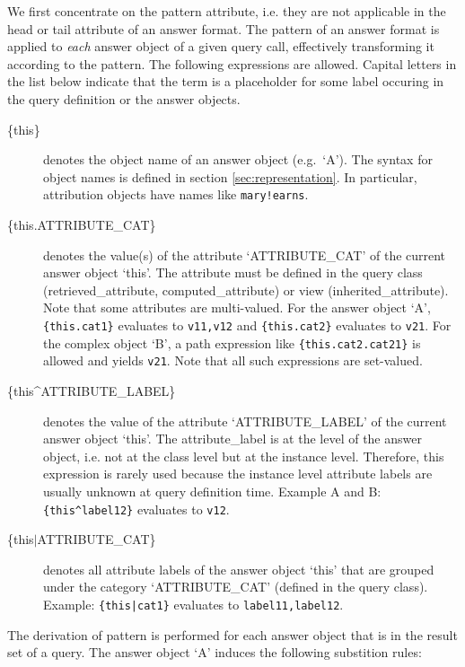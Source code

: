 We first concentrate on the pattern attribute, i.e. they are not applicable in the head or tail attribute
of an answer format. The pattern of an answer format is applied to {\em each\/} answer object 
of a given query call, effectively transforming it according to the pattern.
The following expressions are allowed. Capital letters in the list below indicate that the 
term is a placeholder for some label occuring in the query definition or the answer objects. 

\begin{description}
\item[\{this\}]
  denotes the object name of an answer object (e.g.\ `A'). The syntax for object names is defined in
  section \ref{sec:representation}. In particular, attribution objects have names like {\tt mary!earns}.

\item[\{this.ATTRIBUTE\_CAT\}]
denotes the value(s) of the attribute `ATTRIBUTE\_CAT' of the current answer object `this'. The attribute must be defined in the query class
(retrieved\_attribute, computed\_attribute) or view (inherited\_attribute). Note that some attributes are multi-valued. For the answer object `A',
\verb+{this.cat1}+ evaluates to {\tt v11,v12} and \verb+{this.cat2}+ evaluates to {\tt v21}. For the complex object `B', a path expression like \verb+{this.cat2.cat21}+ is allowed
and yields {\tt v21}. Note that all such expressions are set-valued.

\item[\{this\^{}ATTRIBUTE\_LABEL\}]
denotes the value of the attribute `ATTRIBUTE\_LABEL' of the current answer object `this'. The attribute\_label is at the level of the answer
object, i.e. not at the class level but at the instance level. Therefore, this expression is rarely used because the instance level attribute labels are
usually unknown at query definition time. Example A and B: \verb+{this^label12}+ evaluates to {\tt v12}.

\item[\{this$\mid$ATTRIBUTE\_CAT\}]
denotes all attribute labels of the answer object `this' that are grouped under the category `ATTRIBUTE\_CAT' (defined in the query class).
Example: \verb+{this|cat1}+ evaluates to \verb+label11,label12+.
\end{description}


The derivation of pattern is performed for each answer object that is in the result set of a query. The answer object `A' induces the following
substition rules:


